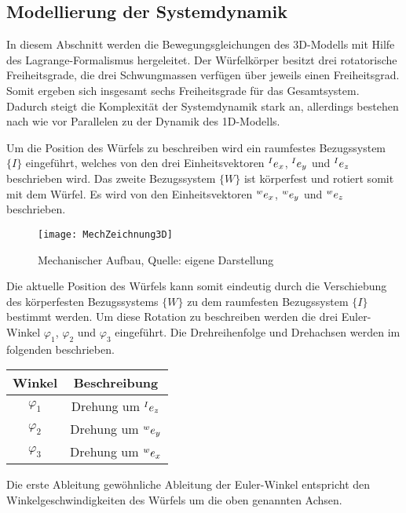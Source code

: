 \subsection{Modellierung der Systemdynamik}
In diesem Abschnitt werden die Bewegungsgleichungen des 3D-Modells mit Hilfe des Lagrange-Formalismus hergeleitet. Der Würfelkörper besitzt drei rotatorische Freiheitsgrade, die drei Schwungmassen verfügen über jeweils einen Freiheitsgrad. Somit ergeben sich insgesamt sechs Freiheitsgrade für das Gesamtsystem. Dadurch steigt die Komplexität der Systemdynamik stark an, allerdings bestehen nach wie vor Parallelen zu der Dynamik des 1D-Modells.
\newline

Um die Position des Würfels zu beschreiben wird ein raumfestes Bezugssystem $\{I\}$ eingeführt, welches von den drei Einheitsvektoren $\prescript{I}{} e_x$, $\prescript{I}{} e_y$ und $\prescript{I}{} e_z$ beschrieben wird. Das zweite Bezugssystem $\{W\}$ ist körperfest und rotiert somit mit dem Würfel. Es wird von den Einheitsvektoren $\prescript{w}{} e_x$, $\prescript{w}{} e_y$ und $\prescript{w}{} e_z$ beschrieben.

\begin{figure}[h]
\centering
\texttt{[image: MechZeichnung3D]}
\caption{Mechanischer Aufbau, Quelle: eigene Darstellung}
\end{figure}

Die aktuelle Position des Würfels kann somit eindeutig durch die Verschiebung des körperfesten Bezugssystems $\{W\}$ zu dem raumfesten Bezugssystem $\{I\}$ bestimmt werden. Um diese Rotation zu beschreiben werden die drei Euler-Winkel $\varphi_1$, $\varphi_2$ und $\varphi_3$ eingeführt. Die Drehreihenfolge und Drehachsen werden im folgenden beschrieben.

\begin{table}[h]
\centering
\begin{tabular}{|c|c|}
\hline
\textbf{Winkel} & \textbf{Beschreibung} \\ \hline
$\varphi_1$ & Drehung um $\prescript{I}{} e_z$ \\ \hline
$\varphi_2$ & Drehung um $\prescript{w}{} e_y$  \\ \hline
$\varphi_3$ & Drehung um $\prescript{w}{} e_x$ \\ \hline
\end{tabular}
\end{table}

Die erste Ableitung gewöhnliche Ableitung der Euler-Winkel entspricht den Winkelgeschwindigkeiten des Würfels um die oben genannten Achsen.

